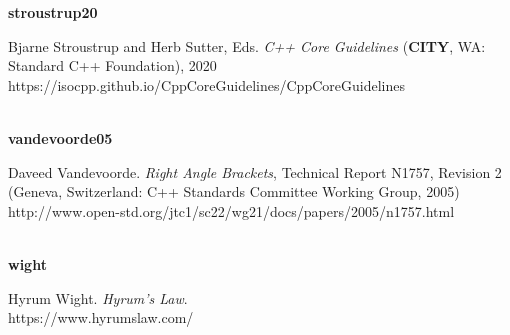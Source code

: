 \noindent\textbf{stroustrup20}\\
\hspace*{2em}\parbox[t]{\textwidth}{Bjarne Stroustrup and Herb Sutter, Eds. \textit{C++ Core Guidelines} (\textbf{CITY}, WA: Standard C++ Foundation), 2020\\
https://isocpp.github.io/CppCoreGuidelines/CppCoreGuidelines} \\

\noindent\textbf{vandevoorde05}\\
\hspace*{2em}\parbox[t]{\textwidth}{Daveed Vandevoorde. \textit{Right Angle Brackets}, Technical Report N1757, Revision 2 (Geneva, Switzerland: C++ Standards Committee Working Group, 2005)\\
http://www.open-std.org/jtc1/sc22/wg21/docs/papers/2005/n1757.html}\\

\noindent\textbf{wight}\\
\hspace*{2em}\parbox[t]{\textwidth}{Hyrum Wight. \textit{Hyrum's Law}.\\
https://www.hyrumslaw.com/}\\




